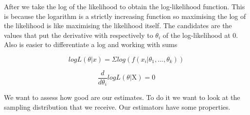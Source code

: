 After we take the log of the likelihood to obtain the log-likelihood function. This is because the logarithm is
a strictly increasing function so maximising the log of the likelihood is like maximising
the likelihood itself. The candidates are the values that put the derivative with respectively
to $\theta_i$ of the log-likelihood at 0. Also is easier to differentiate a log and working with sums

\begin{equation}
    logL(\theta|x) = \Sigma log(f(x_i | \theta_1, ..., \theta_k))
\end{equation}

\begin{equation}
    \frac{d}{d\theta_i} logL(\theta|\text{X}) = 0
\end{equation}

\vspace{10pt}

We want to assess how good are our estimates. To do it we want to look at the sampling distribution
that we receive. Our estimators have some properties.

